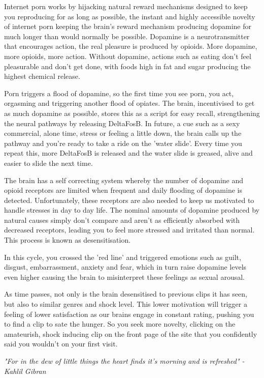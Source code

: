 \documentclass[easypeasy.tex]{subfiles}
\begin{document}
Internet porn works by hijacking natural reward mechanisms designed to keep you reproducing for as long as possible, the instant and highly accessible novelty of internet porn keeping the brain's reward mechanism producing dopamine for much longer than would normally be possible. Dopamine is a neurotransmitter that encourages action, the real pleasure is produced by opioids. More dopamine, more opioids, more action. Without dopamine, actions such as eating don't feel pleasurable and don't get done, with foods high in fat and sugar producing the highest chemical release.

Porn triggers a flood of dopamine, so the first time you see porn, you act, orgasming and triggering another flood of opiates. The brain, incentivised to get as much dopamine as possible, stores this as a script for easy recall, strengthening the neural pathways by releasing DeltaFosB. In future, a cue such as a sexy commercial, alone time, stress or feeling a little down, the brain calls up the pathway and you're ready to take a ride on the 'water slide'. Every time you repeat this, more DeltaFosB is released and the water slide is greased, alive and easier to slide the next time.

The brain has a self correcting system whereby the number of dopamine and opioid receptors are limited when frequent and daily flooding of dopamine is detected. Unfortunately, these receptors are also needed to keep us motivated to handle stresses in day to day life. The nominal amounts of dopamine produced by natural causes simply don't compare and aren't as efficiently absorbed with decreased receptors, leading you to feel more stressed and irritated than normal. This process is known as desensitisation.

In this cycle, you crossed the 'red line' and triggered emotions such as guilt, disgust, embarrassment, anxiety and fear, which in turn raise dopamine levels even higher causing the brain to misinterpret these feelings as sexual arousal.

As time passes, not only is the brain desensitised to previous clips it has seen, but also to similar genres and shock level. This lower motivation will trigger a feeling of lower satisfaction as our brains engage in constant rating, pushing you to find a clip to sate the hunger. So you seek more novelty, clicking on the amateurish, shock inducing clip on the front page of the site that you confidently said you wouldn't on your first visit.

\textit{"For in the dew of little things the heart finds it's morning and is refreshed" - Kahlil Gibran}
\end{document}
